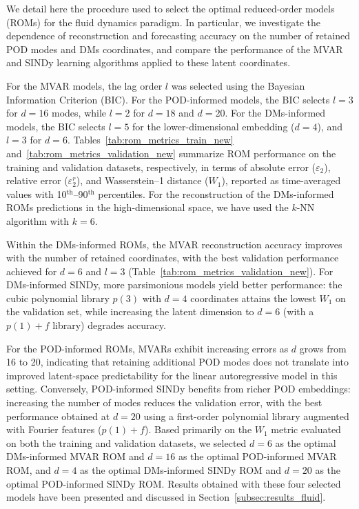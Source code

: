 \documentclass{article}
\begin{document}
We detail here the procedure used to select the optimal reduced-order models (ROMs) for the
fluid dynamics paradigm. In particular, we investigate the dependence of reconstruction and
forecasting accuracy on the number of retained POD modes and DMs coordinates, and compare
the performance of the MVAR and SINDy learning algorithms applied to these latent
coordinates.

For the MVAR models, the lag order $l$ was selected using the Bayesian Information Criterion
(BIC). For the POD-informed models, the BIC selects $l=3$ for $d=16$ modes, while
$l=2$ for $d=18$ and $d=20$. For the DMs-informed models, the BIC selects $l=5$ for
the lower-dimensional embedding ($d=4$), and $l=3$ for $d=6$. Tables~\ref{tab:rom_metrics_train_new} and~\ref{tab:rom_metrics_validation_new} summarize ROM performance on the training and validation datasets, respectively, in
terms of absolute error ($\varepsilon_2$), relative error ($\varepsilon_2^r$), and
Wasserstein--1 distance ($W_1$), reported as time-averaged values with 10$^{\text{th}}$–90$^{\text{th}}$ percentiles. For the reconstruction of the DMs-informed ROMs predictions in the high-dimensional space, we have used the $k$-NN algorithm with $k=6$.

Within the DMs-informed ROMs, the MVAR reconstruction accuracy improves with the number
of retained coordinates, with the best validation performance achieved for $d=6$ and $l=3$
(Table~\ref{tab:rom_metrics_validation_new}). For DMs-informed SINDy, more parsimonious models yield better performance:
the cubic polynomial library $p(3)$ with $d=4$ coordinates attains the lowest $W_1$ on the
validation set, while increasing the latent dimension to $d=6$ (with a $p(1)+f$ library)
degrades accuracy.

For the POD-informed ROMs, MVARs exhibit increasing errors as $d$ grows from 16 to 20, indicating that
retaining additional POD modes does not translate into improved latent-space predictability
for the linear autoregressive model in this setting. Conversely, POD-informed
SINDy benefits from richer POD embeddings: increasing the number of modes reduces the
validation error, with the best performance obtained at $d=20$ using a first-order polynomial
library augmented with Fourier features ($p(1)+f$). Based primarily on the $W_1$ metric evaluated on both the training and validation datasets, we selected $d=6$ as the optimal DMs-informed MVAR ROM and $d=16$ as
the optimal POD-informed MVAR ROM, and $d=4$ as the optimal DMs-informed SINDy ROM and
$d=20$ as the optimal POD-informed SINDy ROM. Results obtained with these four selected
models have been presented and discussed in Section~\ref{subsec:results_fluid}.




\end{document}
